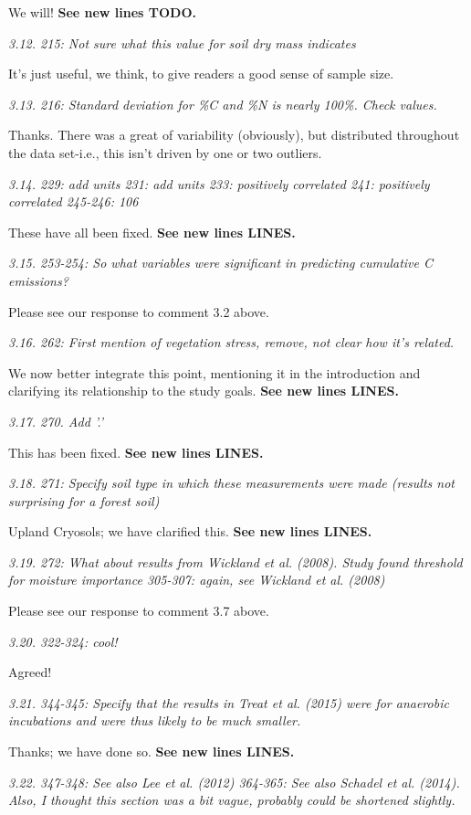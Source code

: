 \documentclass[11pt, oneside]{article}
\begin{document}
We will! {\bf See new lines TODO.}

\medskip
{\it 3.12. 215: Not sure what this value for soil dry mass indicates }

It's just useful, we think, to give readers a good sense of sample size.

\medskip
{\it 3.13. 216: Standard deviation for \%C and \%N is nearly 100\%. Check values. }

Thanks. There was a great of variability (obviously), but distributed throughout the data set-i.e., this isn't driven by one or two outliers.

\medskip
{\it 3.14. 229: add units
231: add units
233: positively correlated
241: positively correlated
245-246: 106 }

These have all been fixed. {\bf See new lines LINES.}

\medskip
{\it 3.15. 253-254: So what variables were significant in predicting cumulative C emissions? }

Please see our response to comment 3.2 above.

\medskip
{\it 3.16. 262: First mention of vegetation stress, remove, not clear how it's related. }

We now better integrate this point, mentioning it in the introduction and clarifying its relationship to the study goals. {\bf See new lines LINES.}

\medskip
{\it 3.17. 270. Add '.' }

This has been fixed. {\bf See new lines LINES.}

\medskip
{\it 3.18. 271: Specify soil type in which these measurements were made (results not surprising for a forest soil) }

Upland Cryosols; we have clarified this. {\bf See new lines LINES.}

\medskip
{\it 3.19. 272: What about results from Wickland et al. (2008). Study found threshold for moisture importance
305-307: again, see Wickland et al. (2008) }

Please see our response to comment 3.7 above.

\medskip
{\it 3.20. 322-324: cool! }

Agreed!

\medskip
{\it 3.21. 344-345: Specify that the results in Treat et al. (2015) were for anaerobic incubations and were thus likely to be much smaller. }

Thanks; we have done so. {\bf See new lines LINES.}

\medskip
{\it 3.22. 347-348: See also Lee et al. (2012)
364-365: See also Schadel et al. (2014). Also, I thought this section was a bit vague, probably could be shortened slightly. }
\end{document}
